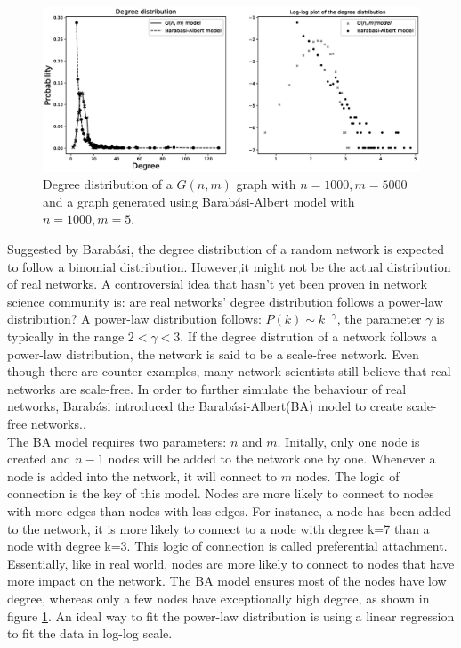 \documentclass[12pt]{article}
\begin{document}
{\begin{figure}[ht]
    \centering
    \includegraphics[width=\textwidth]{degree_distribution.eps}
    \centering
    \caption{Degree distribution of a $G(n,m)$ graph with $n=1000,m=5000$ and a graph generated using Barabási-Albert model with $n=1000,m=5$.}
    \label{fig:degree_dist}
\end{figure}
\noindent
Suggested by Barabási\cite{barabási2016network}, the degree distribution of a random network is expected to follow a binomial distribution. However,it might not be the actual distribution of real networks. A controversial idea that hasn't yet been proven in network science community is: are real networks' degree distribution follows a power-law distribution? A power-law distribution follows: $P(k) \sim k^{-\gamma }$, the parameter $\gamma$ is typically in the range $2<\gamma<3$. If the degree distrution of a network follows a power-law distribution, the network is said to be a scale-free network. Even though there are counter-examples\cite{broido_clauset_2019}, many network scientists still believe that real networks are scale-free\cite{albert1999diameter}. In order to further simulate the behaviour of real networks, Barabási introduced the Barabási-Albert(BA) model to create scale-free networks.\cite{barabási2016network}.\\
The BA model requires two parameters: $n$ and $m$. Initally, only one node is created and $n-1$ nodes will be added to the network one by one. Whenever a node is added into the network, it will connect to $m$ nodes. The logic of connection is the key of this model. Nodes are more likely to connect to nodes with more edges than nodes with less edges. For instance, a node has been added to the network, it is more likely to connect to a node with degree k=7 than a node with degree k=3. This logic of connection is called preferential attachment. Essentially, like in real world, nodes are more likely to connect to nodes that have more impact on the network.\cite{pa_test} The BA model ensures most of the nodes have low degree, whereas only a few nodes have exceptionally high degree, as shown in figure \ref{fig:degree_dist}. An ideal way to fit the power-law distribution is using a linear regression to fit the data in log-log scale.

}
\end{document}
